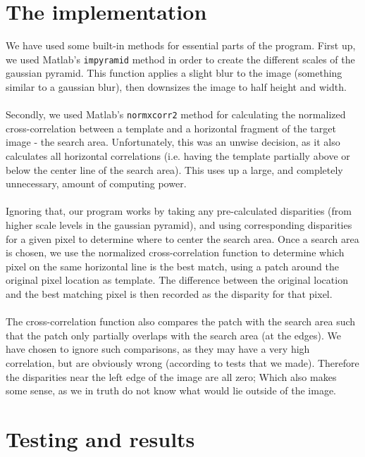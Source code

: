 \documentclass[12pt,a4paper,oneside,final]{article}
\begin{document}
	\section{The implementation}
	We have used some built-in methods for essential parts of the program. First up, we used Matlab's \texttt{impyramid} method in order to create the different scales of the gaussian pyramid. This function applies a slight blur to the image (something similar to a gaussian blur), then downsizes the image to half height and width.\\\\
	Secondly, we used Matlab's \texttt{normxcorr2} method for calculating the normalized cross-correlation between a template and a horizontal fragment of the target image - the search area. Unfortunately, this was an unwise decision, as it also calculates all horizontal correlations (i.e. having the template partially above or below the center line of the search area). This uses up a large, and completely unnecessary, amount of computing power.\\\\
	Ignoring that, our program works by taking any pre-calculated disparities (from higher scale levels in the gaussian pyramid), and using corresponding disparities for a given pixel to determine where to center the search area. Once a search area is chosen, we use the normalized cross-correlation function to determine which pixel on the same horizontal line is the best match, using a patch around the original pixel location as template. The difference between the original location and the best matching pixel is then recorded as the disparity for that pixel.\\\\
	The cross-correlation function also compares the patch with the search area such that the patch only partially overlaps with the search area (at the edges). We have chosen to ignore such comparisons, as they may have a very high correlation, but are obviously wrong (according to tests that we made). Therefore the disparities near the left edge of the image are all zero; Which also makes some sense, as we in truth do not know what would lie outside of the image.
	
	\section{Testing and results}
	
\end{document}
